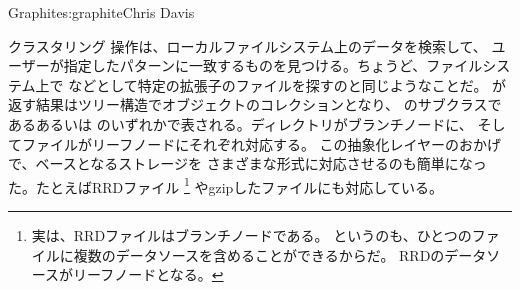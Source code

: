 \begin{aosachapter}{Graphite}{s:graphite}{Chris Davis}
\begin{aosasect1}{クラスタリング}
操作は、ローカルファイルシステム上のデータを検索して、
ユーザーが指定したパターンに一致するものを見つける。ちょうど、ファイルシステム上で
などとして特定の拡張子のファイルを探すのと同じようなことだ。
が返す結果はツリー構造でオブジェクトのコレクションとなり、
のサブクラスであるあるいは
のいずれかで表される。ディレクトリがブランチノードに、
そしてファイルがリーフノードにそれぞれ対応する。
この抽象化レイヤーのおかげで、ベースとなるストレージを
さまざまな形式に対応させるのも簡単になった。たとえばRRDファイル
\footnote{実は、RRDファイルはブランチノードである。
というのも、ひとつのファイルに複数のデータソースを含めることができるからだ。
RRDのデータソースがリーフノードとなる。}
やgzipしたファイルにも対応している。


\end{aosasect1}
\end{aosachapter}
